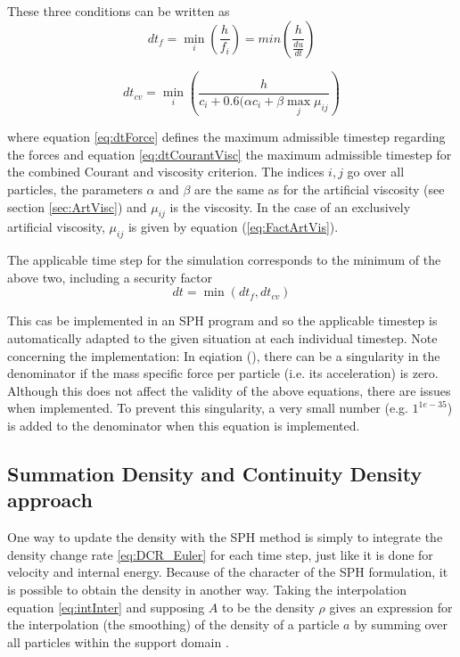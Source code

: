 \documentclass{report}
\begin{document}
These three conditions can be written as \cite{Monaghan1989,Monaghan1992}
\begin{equation}
\label{eq:dtForce}
 dt_f=\min_i(\frac{h}{f_i})=min(\frac{h}{\frac{du}{dt}})
\end{equation}

\begin{equation}
\label{eq:dtCourantVisc}
 dt_{cv}=\min_i(\frac{h}{c_i+0.6(\alpha c_i+\beta \max_j \mu_{ij}})
\end{equation}

where equation \ref{eq:dtForce} defines the maximum admissible timestep regarding the forces and equation \ref{eq:dtCourantVisc} the maximum admissible timestep for the combined Courant and viscosity criterion. The indices $i,j$ go over all particles, the parameters $\alpha$ and $\beta$ are the same as for the artificial viscosity (see section \ref{sec:ArtVisc}) and $\mu_{ij}$ is the viscosity. In the case of an exclusively artificial viscosity, $\mu_{ij}$ is given by equation (\ref{eq:FactArtVis}).

The applicable time step for the simulation corresponds to the minimum of the above two, including a security factor 
\begin{equation}
\label{eq:dt}
dt=\min(dt_f,dt_{cv})
\end{equation}

This cas be implemented in an SPH program and so the applicable timestep is automatically adapted to the given situation at each individual timestep. 
Note concerning the implementation: In eqiation (\label{eq:dtForce}), there can be a singularity in the denominator if the mass specific force per particle (i.e. its acceleration) is zero. Although this does not affect the validity of the above equations, there are issues when implemented. To prevent this singularity, a very small number (e.g. $1^{1e-35}$) is added to the denominator when this equation is implemented.


\subsection{Summation Density and Continuity Density approach}
\label{sec:DensCalcMode}
One way to update the density with the SPH method is simply to integrate the density 
change rate \ref{eq:DCR_Euler} for each time step, just like it is done for velocity 
and internal energy. Because of the character of the SPH formulation, it is  
possible to obtain the density in another way. Taking the interpolation equation 
\ref{eq:intInter} and supposing $A$ to be the density $\rho$ gives an expression for 
the interpolation (the smoothing) of the density of a particle $a$ by summing over 
all particles within the support domain \cite{Monaghan2005}.
\end{document}
